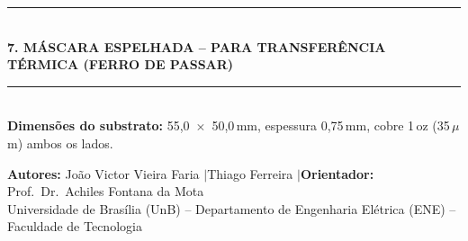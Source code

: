 \documentclass[10pt,a4paper]{article}
\newenvironment{panel}[1]{%
  \par\noindent\textcolor{unbblue}{\rule{\textwidth}{1.1pt}}\\[1pt]
  {\bfseries\color{unbblue} #1}\\[2pt]
  \textcolor{unbblue}{\rule{\textwidth}{0.4pt}}\\[4pt]
}{%
  \par\vspace{2pt}
}
\begin{document}
\begin{panel}{7. M\'ASCARA ESPELHADA -- PARA TRANSFER\^ENCIA T\'ERMICA (FERRO DE PASSAR)}
\vspace{4pt}
\textbf{Dimens\~oes do substrato:}
55,0~$\times$~50,0\,mm, espessura 0,75\,mm, cobre 1\,oz (35\,$\mu$m)
ambos os lados.

\normalsize
\end{panel}

\vfill
\begin{center}
\footnotesize\color{steel}
\textbf{Autores:} Jo\~ao Victor Vieira Faria \quad$\vert$\quad Thiago Ferreira
\quad$\vert$\quad \textbf{Orientador:} Prof.\ Dr.\ Achiles Fontana da Mota\\[1pt]
Universidade de Bras\'ilia (UnB) -- Departamento de Engenharia El\'etrica (ENE)
-- Faculdade de Tecnologia
\end{center}
\end{document}
